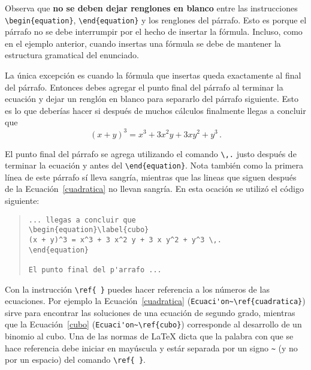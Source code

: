 Observa  que \textbf{no se deben dejar
renglones en blanco} entre las instrucciones \verb|\begin{equation}|, \verb|\end{equation}|
y los renglones del p\'arrafo. Esto es porque el p\'arrafo no se debe interrumpir por el
hecho de insertar la f\'ormula. Incluso, como en el ejemplo anterior, cuando insertas una
f\'ormula se debe de mantener la estructura gramatical del enunciado.

La \'unica excepci\'on es cuando la f\'ormula que insertas queda exactamente al final del
p\'arrafo. Entonces debes agregar el punto final del p\'arrafo al terminar la ecuaci\'on
y dejar un rengl\'on en blanco para separarlo del p\'arrafo siguiente. Esto es lo que
deber\'ias hacer si despu\'es de muchos c\'alculos finalmente llegas a concluir que
\begin{equation}\label{cubo}
(x + y)^3 = x^3 + 3 x^2 y + 3 x y^2 + y^3 \,.
\end{equation}

El punto final del p\'arrafo se agrega utilizando el comando \verb|\,.| justo
despu\'es de terminar la ecuaci\'on y antes del \verb|\end{equation}|. Nota tambi\'en
como la primera l\'inea de este p\'arrafo s\'i lleva sangr\'ia, mientras que las lineas
que siguen despu\'es de la Ecuaci\'on~\ref{cuadratica} no llevan sangr\'ia. En esta ocaci\'on
se utiliz\'o el c\'odigo siguiente:

\begin{quote}
\begin{verbatim}
... llegas a concluir que
\begin{equation}\label{cubo}
(x + y)^3 = x^3 + 3 x^2 y + 3 x y^2 + y^3 \,.
\end{equation}

El punto final del p'arrafo ...
\end{verbatim}
\end{quote}

Con  la instrucci\'on \verb|\ref{ }| puedes hacer
referencia a los n\'umeros de las ecuaciones. Por ejemplo la Ecuaci\'on~\ref{cuadratica}
(\verb|Ecuaci'on~\ref{cuadratica}|) sirve para encontrar las soluciones de una ecuaci\'on
de segundo grado, mientras que la Ecuaci\'on~\ref{cubo} (\verb|Ecuaci'on~\ref{cubo}|)
corresponde al desarrollo de un binomio al cubo. Una de las normas de \LaTeX{} dicta que
la palabra con que se hace referencia debe iniciar en may\'uscula y est\'ar separada por un
signo \verb|~| (y no por un espacio) del comando \verb|\ref{ }|.

